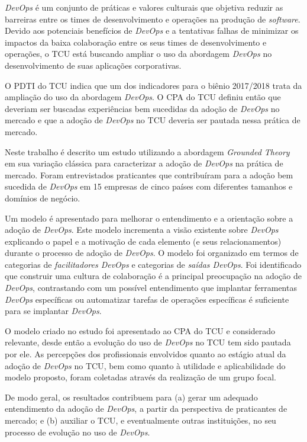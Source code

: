 \textit{DevOps} é um conjunto de práticas e valores culturais que objetiva
reduzir as barreiras entre os times de desenvolvimento e operações na produção
de \textit{software}. Devido aos potenciais benefícios de \textit{DevOps} e a
tentativas falhas de minimizar os impactos da baixa colaboração entre os seus
times de desenvolvimento e operações, o \acrshort{TCU} está buscando ampliar o
uso da abordagem \textit{DevOps} no desenvolvimento de suas aplicações corporativas.

O \acrfull{PDTI} do \acrshort{TCU} indica que um dos indicadores para o
biênio 2017/2018 trata da ampliação do uso da abordagem \textit{DevOps}. O
\acrfull{CPA} do \acrshort{TCU} definiu então que deveriam ser buscadas
experiências bem sucedidas da adoção de \textit{DevOps} no mercado e que a
adoção de \textit{DevOps} no TCU deveria ser pautada nessa prática de mercado.

Neste trabalho é descrito um estudo utilizando a abordagem \textit{Grounded
Theory} em sua variação clássica para caracterizar a adoção de \textit{DevOps}
na prática de mercado. Foram entrevistados praticantes que contribuíram para a
adoção bem sucedida de \textit{DevOps} em 15 empresas de cinco países com
diferentes tamanhos e domínios de negócio.

Um modelo é apresentado para melhorar o entendimento e a orientação sobre a
adoção de \textit{DevOps}. Este modelo incrementa a visão existente sobre
\textit{DevOps} explicando o papel e a motivação de cada elemento (e seus
relacionamentos) durante o processo de adoção de \textit{DevOps}. O modelo foi
organizado em termos de categorias de
\emph{facilitadores DevOps} e categorias de \emph{saídas DevOps}. Foi
identificado que construir uma cultura de colaboração é a principal preocupação
na adoção de \textit{DevOps}, contrastando com um possível entendimento que
implantar ferramentas \textit{DevOps} específicas ou automatizar tarefas de
operações específicas é suficiente para se implantar \textit{DevOps}.

O modelo criado no estudo foi apresentado ao \acrshort{CPA} do \acrshort{TCU} e
considerado relevante, desde então a evolução do uso de \textit{DevOps} no
\acrshort{TCU} tem sido pautada por ele. As percepções dos profissionais
envolvidos quanto ao estágio atual da adoção de \textit{DevOps} no \acrshort{TCU},
bem como quanto à utilidade e aplicabilidade do modelo proposto, foram coletadas
através da realização de um grupo focal.

De modo geral, os resultados contribuem para (a) gerar um adequado entendimento
da adoção de \textit{DevOps}, a partir da perspectiva de praticantes de mercado;
e (b) auxiliar o \acrshort{TCU}, e eventualmente outras instituições, no seu
processo de evolução no uso de \textit{DevOps}.
